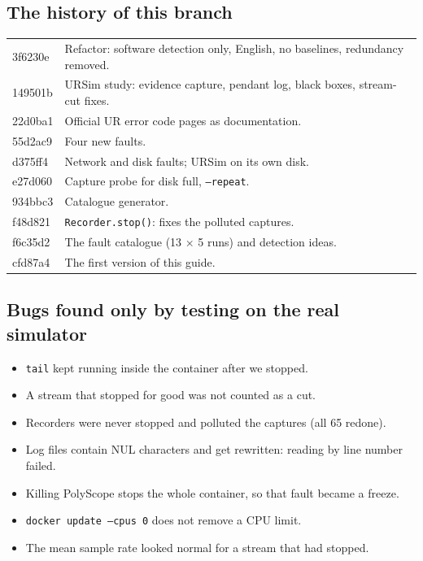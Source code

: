 \documentclass[10pt]{article}
\newcommand{\brkus}{\textunderscore\allowbreak}
\newcommand{\f}[1]{\texttt{\let\_\brkus #1}}
\begin{document}
\subsection{The history of this branch}
\begin{center}\footnotesize
\begin{tabularx}{\linewidth}{@{}>{\ttfamily}l X@{}}
\toprule
3f6230e & Refactor: software detection only, English, no baselines, redundancy removed. \\
149501b & URSim study: evidence capture, pendant log, black boxes, stream-cut fixes. \\
22d0ba1 & Official UR error code pages as documentation. \\
55d2ac9 & Four new faults. \\
d375ff4 & Network and disk faults; URSim on its own disk. \\
e27d060 & Capture probe for disk full, \f{--repeat}. \\
934bbc3 & Catalogue generator. \\
f48d821 & \f{Recorder.stop()}: fixes the polluted captures. \\
f6c35d2 & The fault catalogue (13 \(\times\) 5 runs) and detection ideas. \\
cfd87a4 & The first version of this guide. \\
\bottomrule
\end{tabularx}
\end{center}

\subsection{Bugs found only by testing on the real simulator}
\begin{itemize}
\item \f{tail} kept running inside the container after we stopped.
\item A stream that stopped for good was not counted as a cut.
\item Recorders were never stopped and polluted the captures (all 65 redone).
\item Log files contain NUL characters and get rewritten: reading by line number failed.
\item Killing PolyScope stops the whole container, so that fault became a freeze.
\item \f{docker update --cpus 0} does not remove a CPU limit.
\item The mean sample rate looked normal for a stream that had stopped.
\end{itemize}
\end{document}
